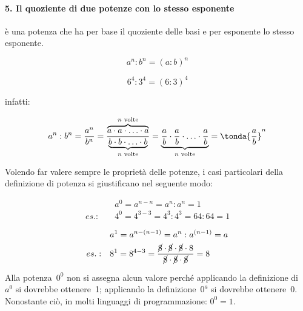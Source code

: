 \paragraph{5. Il quoziente di due potenze con lo stesso esponente} 
è una potenza che ha per base il quoziente delle basi e per esponente lo 
stesso esponente.

\begin{minipage}[h]{.35\textwidth}
\vspace{4.5mm}
\[\boxed{a^n:b^n=(a:b)^n}\]
\end{minipage}\hfil
\begin{minipage}[h]{.35\textwidth}
\[6^4:3^4=(6:3)^4\]
\end{minipage}
\hfil
\begin{minipage}[c]{.25\textwidth}
\vspace{4.5mm}
\centering infatti:
\end{minipage}
\[a^n : b^n = \frac{a^n}{b^n} = 
  \frac{\overbrace{a\cdot a\cdot\ldots\cdot a}^{n\text{ volte}} }
       {\underbrace{b\cdot b\cdot\ldots\cdot b}_{n\text{ volte}}}=
  \underbrace{\frac{a}{b}\cdot \frac{a}{b}\cdot\ldots\cdot
              \frac{a}{b}}_{n\text{ volte}}=
   \tonda{\frac{a}{b}}^n\]

Volendo far valere sempre le proprietà delle potenze, i casi particolari della
definizione di potenza si giustificano nel seguente modo:
\vspace{-1.5em}
\begin{multicols}{2}
\begin{align*}
 &a^0=a^{n-n}=a^n:a^n=1\\
 es.:\quad &4^0 = 4^{3-3} = 4^3 : 4^3 = 64 : 64 = 1
\end{align*}

\begin{align*}
 &a^1=a^{n-(n-1)} = a^n : a^{(n-1)} = a\\
 es.:\quad &8^1 = 8^{4-3} = 
    \frac{\cancel{8} \cdot \cancel{8} \cdot \cancel{8} \cdot 8}
    {\cancel{8} \cdot \cancel{8} \cdot \cancel{8}} = 8
\end{align*}
\end{multicols}
\vspace{-1.5em}
\osservazione 
Alla potenza~\(0^0\) non si assegna alcun valore perché applicando la 
definizione di~\(a^0\) si dovrebbe ottenere~1;
applicando la definizione~\(0^a\) si dovrebbe ottenere~0. Nonostante ciò, in 
molti linguaggi di programmazione: \(0^0 = 1\).


